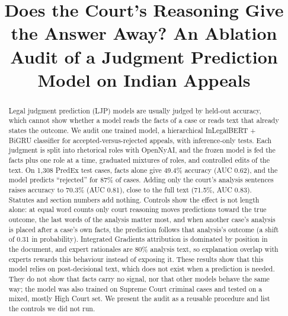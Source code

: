 \documentclass[conference]{IEEEtran}
\begin{document}
\title{\LARGE \bf Does the Court's Reasoning Give the Answer Away? An Ablation Audit of a Judgment Prediction Model on Indian Appeals}

\author{
}

\maketitle

\begin{abstract}
Legal judgment prediction (LJP) models are usually judged by held-out accuracy, which cannot show whether a model reads the facts of a case or reads text that already states the outcome. We audit one trained model, a hierarchical InLegalBERT + BiGRU classifier for accepted-versus-rejected appeals, with inference-only tests. Each judgment is split into rhetorical roles with OpenNyAI, and the frozen model is fed the facts plus one role at a time, graduated mixtures of roles, and controlled edits of the text. On 1,308 PredEx test cases, facts alone give 49.4\% accuracy (AUC 0.62), and the model predicts ``rejected'' for 87\% of cases. Adding only the court's analysis sentences raises accuracy to 70.3\% (AUC 0.81), close to the full text (71.5\%, AUC 0.83). Statutes and section numbers add nothing. Controls show the effect is not length alone: at equal word counts only court reasoning moves predictions toward the true outcome, the last words of the analysis matter most, and when another case's analysis is placed after a case's own facts, the prediction follows that analysis's outcome (a shift of 0.31 in probability). Integrated Gradients attribution is dominated by position in the document, and expert rationales are 80\% analysis text, so explanation overlap with experts rewards this behaviour instead of exposing it. These results show that this model relies on post-decisional text, which does not exist when a prediction is needed. They do not show that facts carry no signal, nor that other models behave the same way; the model was also trained on Supreme Court criminal cases and tested on a mixed, mostly High Court set. We present the audit as a reusable procedure and list the controls we did not run.
\end{abstract}
\end{document}
